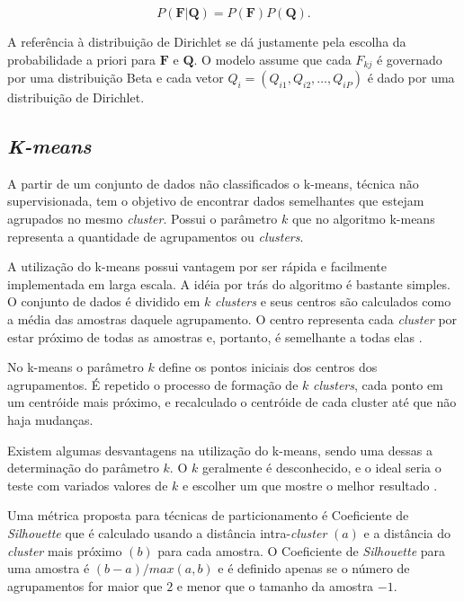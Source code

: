 \begin{equation}
P(\textbf{F}|\textbf{Q}) = {P(\textbf{F})P(\textbf{Q})}.
\end{equation}

A referência à distribuição de Dirichlet se dá justamente pela escolha da probabilidade a priori para $\textbf{F}$ e $\textbf{Q}$. O modelo assume que cada $F_{kj}$ é governado por uma distribuição Beta e cada vetor $Q_{i} = (Q_{i1}, Q_{i2}, \dots, Q_{iP})$ é dado por uma distribuição de Dirichlet.




\subsection{\textit{K-means}}


A partir de um conjunto de dados não classificados o k-means, técnica não supervisionada, tem o objetivo de encontrar dados semelhantes que estejam agrupados no mesmo \textit{cluster}. Possui o parâmetro $k$ que no algoritmo k-means representa a quantidade de agrupamentos ou \textit{clusters}. 

A utilização do k-means possui vantagem por ser rápida e facilmente implementada em larga escala. A idéia por trás do algoritmo é bastante simples. O conjunto de dados é dividido em $k$ \textit{clusters} e seus centros são calculados como a média das amostras daquele agrupamento. O centro representa cada \textit{cluster} por estar próximo de todas as amostras e, portanto, é semelhante a todas elas \cite{mucherino2009}.

No k-means o parâmetro $k$ define os pontos iniciais dos centros dos agrupamentos. É repetido o processo de formação de $k$ \textit{clusters}, cada ponto em um centróide mais próximo, e recalculado o centróide de cada cluster até que não haja mudanças. 


Existem algumas desvantagens na utilização do k-means, sendo uma dessas a determinação do parâmetro $k$. O $k$ geralmente é desconhecido, e o ideal seria o teste com variados valores de $k$ e escolher um que mostre o melhor resultado \cite{tan2005}.


Uma métrica proposta para técnicas de particionamento é Coeficiente de \textit{Silhouette} 
que é calculado usando a distância intra-\textit{cluster} $(a)$ e a distância do \textit{cluster} mais próximo $(b)$ para cada amostra. O Coeficiente de \textit{Silhouette} para uma amostra é $(b-a)/max(a,b)$ 
e é definido apenas se o número de agrupamentos for maior que $2$ e menor que o tamanho da amostra $- 1$.

